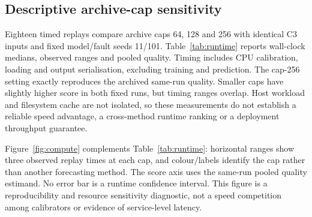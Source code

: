 \subsection{Descriptive archive-cap sensitivity}

Eighteen timed replays compare archive caps 64, 128 and 256 with identical C3 inputs and fixed model/fault seeds 11/101. Table~\ref{tab:runtime} reports wall-clock medians, observed ranges and pooled quality. Timing includes CPU calibration, loading and output serialisation, excluding training and prediction. The cap-256 setting exactly reproduces the archived same-run quality. Smaller caps have slightly higher score in both fixed runs, but timing ranges overlap. Host workload and filesystem cache are not isolated, so these measurements do not establish a reliable speed advantage, a cross-method runtime ranking or a deployment throughput guarantee.


Figure~\ref{fig:compute} complements Table~\ref{tab:runtime}: horizontal ranges show three observed replay times at each cap, and colour/labels identify the cap rather than another forecasting method. The score axis uses the same-run pooled quality estimand. No error bar is a runtime confidence interval. This figure is a reproducibility and resource sensitivity diagnostic, not a speed competition among calibrators or evidence of service-level latency.
